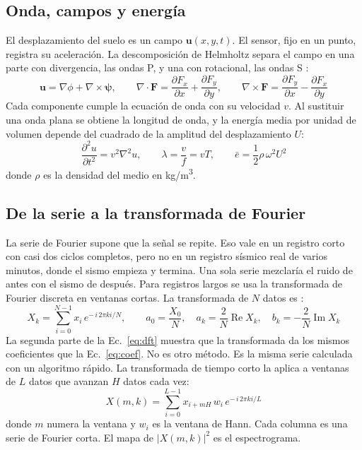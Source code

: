 \documentclass[11pt,letterpaper]{article}
\begin{document}
\subsection{Onda, campos y energía}
El desplazamiento del suelo es un campo $\mathbf{u}(x,y,t)$. El sensor, fijo en un punto, registra su aceleración. La descomposición de Helmholtz separa el campo en una parte con divergencia, las ondas P, y una con rotacional, las ondas S \parencite{shearer2019}:
\begin{equation}
\mathbf{u} = \nabla\phi + \nabla\times\boldsymbol{\psi}, \qquad \nabla\cdot\mathbf{F} = \frac{\partial F_x}{\partial x} + \frac{\partial F_y}{\partial y}, \qquad \nabla\times\mathbf{F} = \frac{\partial F_y}{\partial x} - \frac{\partial F_x}{\partial y}
\label{eq:helm}
\end{equation}
Cada componente cumple la ecuación de onda con su velocidad $v$. Al sustituir una onda plana se obtiene la longitud de onda, y la energía media por unidad de volumen depende del cuadrado de la amplitud del desplazamiento $U$:
\begin{equation}
\frac{\partial^2 u}{\partial t^2} = v^2\nabla^2 u, \qquad \lambda = \frac{v}{f} = vT, \qquad \bar{e} = \frac{1}{2}\rho\,\omega^2 U^2
\label{eq:onda}
\end{equation}
donde $\rho$ es la densidad del medio en \si{kg/m^3}.

\subsection{De la serie a la transformada de Fourier}
La serie de Fourier supone que la señal se repite. Eso vale en un registro corto con casi dos ciclos completos, pero no en un registro sísmico real de varios minutos, donde el sismo empieza y termina. Una sola serie mezclaría el ruido de antes con el sismo de después. Para registros largos se usa la transformada de Fourier discreta en ventanas cortas. La transformada de $N$ datos es \parencite{cooley1965}:
\begin{equation}
X_k = \sum_{i=0}^{N-1} x_i\, e^{-\,i\,2\pi k i/N}, \qquad a_0 = \frac{X_0}{N}, \quad a_k = \frac{2}{N}\operatorname{Re}X_k, \quad b_k = -\frac{2}{N}\operatorname{Im}X_k
\label{eq:dft}
\end{equation}
La segunda parte de la Ec.~\eqref{eq:dft} muestra que la transformada da los mismos coeficientes que la Ec.~\eqref{eq:coef}. No es otro método. Es la misma serie calculada con un algoritmo rápido. La transformada de tiempo corto la aplica a ventanas de $L$ datos que avanzan $H$ datos cada vez:
\begin{equation}
X(m,k) = \sum_{i=0}^{L-1} x_{i+mH}\, w_i\, e^{-\,i\,2\pi k i/L}
\label{eq:stft}
\end{equation}
donde $m$ numera la ventana y $w_i$ es la ventana de Hann. Cada columna es una serie de Fourier corta. El mapa de $|X(m,k)|^2$ es el espectrograma.
\end{document}

